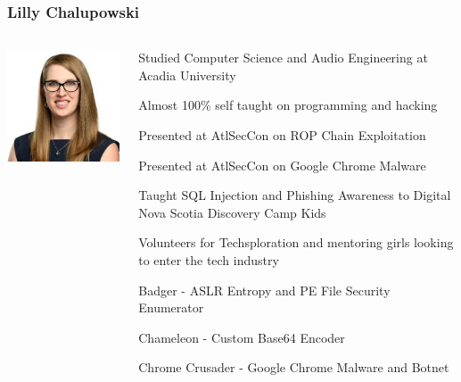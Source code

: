 \documentclass[aspectratio=169]{beamer}
\begin{document}
\begin{frame}
  \frametitle{Lilly Chalupowski}
  \begin{columns}
    \begin{column}{0.5\textwidth}
      \includegraphics[scale=0.5]{lilly_chalupowski}
    \end{column}
    \begin{column}{0.5\textwidth}
      \begin{center}
        \begin{tcolorbox}[title=Biography,colback=gray]
          \begin{itemize}
            {\color{black} \tiny
            \item Studied Computer Science and Audio Engineering at Acadia University
            \item Almost 100\% self taught on programming and hacking
            \item Presented at AtlSecCon on ROP Chain Exploitation
            \item Presented at AtlSecCon on Google Chrome Malware
            \item Taught SQL Injection and Phishing Awareness to Digital Nova Scotia Discovery Camp Kids
            \item Volunteers for Techsploration and mentoring girls looking to enter the tech industry
            \item Badger - ASLR Entropy and PE File Security Enumerator
            \item Chameleon - Custom Base64 Encoder
            \item Chrome Crusader - Google Chrome Malware and Botnet
            }
          \end{itemize}
        \end{tcolorbox}
      \end{center}
    \end{column}
  \end{columns}
\end{frame}
\end{document}
